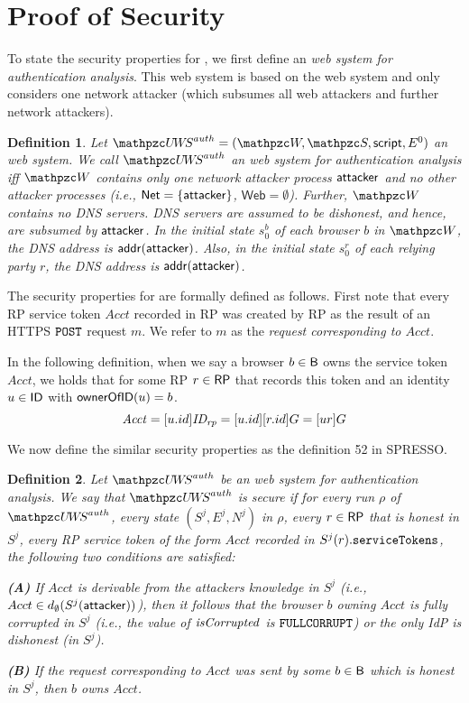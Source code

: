 \documentclass[letterpaper,onecolumn,10pt]{article}
\newtheorem{definition}{Definition}
\begin{document}
\section{Proof of Security}

To state the security properties for \uppresso, we first
define an \emph{\uppresso web system for authentication analysis}. This
web system is based on the \uppresso web system and only considers one
network attacker (which subsumes all web attackers and further network
attackers).

\begin{definition}
  Let $\uppressoauthwebsystem = (\bidsystem, \scriptset, \mathsf{script}, E^0)$
  an \uppresso web system. We call $\uppressoauthwebsystem$ an
  \emph{\uppresso web system for authentication analysis} iff
  $\bidsystem$ contains only one network attacker process
  $\mathsf{attacker}$ and no other attacker processes (i.e.,
  $\mathsf{Net} = \{\mathsf{attacker}\}$, $\mathsf{Web} = \emptyset$).
  Further, $\bidsystem$ contains no DNS servers. DNS servers are
  assumed to be dishonest, and hence, are subsumed by
  $\mathsf{attacker}$. In the initial state $s_0^b$ of each browser $b$
  in $\bidsystem$, the DNS address is
  $\mathsf{addr}(\mathsf{attacker})$. Also, in the initial state
  $s_0^r$ of each relying party $r$, the DNS address is
  $\mathsf{addr}(\mathsf{attacker})$.
\end{definition}

The security properties for \uppresso are formally defined as follows.
First note that every RP service token $Acct$ recorded in RP was
created by RP as the result of an HTTPS $\mathtt{POST}$ request $m$. We refer
to $m$ as the \emph{request corresponding to $Acct$}. 

In the following definition, when we say a browser $b\in \mathsf{B}$ owns the service 
token $Acct$, we holds that for some RP $r\in \mathsf{RP}$ that records this token and 
an identity $u\in \mathsf{ID}$ with $\mathsf{ownerOfID}(u) = b$.
\[\mathit{Acct}=[u.id]\mathit{ID_{rp}}=[u.id][r.id]G=[ur]G\]

We now define the similar security properties as the definition 52 in SPRESSO. 

\begin{definition}\label{def:uppresso-security-property} 
  Let $\uppressoauthwebsystem$ be an \uppresso web system for authentication analysis. 
  We say that \emph{$\uppressoauthwebsystem$ is secure} if for every run $\rho$ of
  $\uppressoauthwebsystem$, every state $(S^j, E^j, N^j)$ in $\rho$,
  every $r\in \mathsf{RP}$ that is honest in $S^j$, every RP service token of the form 
  $Acct$ recorded in $S^j(r).\mathtt{serviceTokens}$, the following two conditions are
  satisfied:

  \textbf{(A)} If $Acct$ is derivable from the attackers knowledge
  in $S^j$ (i.e., $Acct \in d_{\emptyset}(S^j(\mathsf{attacker}))$),
  then it follows that the browser $b$ owning $Acct$ is fully corrupted
  in $S^j$ (i.e., the value of $\mathit{isCorrupted}$ is $\mathtt{FULLCORRUPT}$)
  or the only IdP is dishonest (in $S^j$).

  \textbf{(B)} If the request corresponding to $Acct$ was sent by
  some $b\in \mathsf{B}$ which is honest in $S^j$, then $b$ owns $Acct$.
\end{definition}
\end{document}
